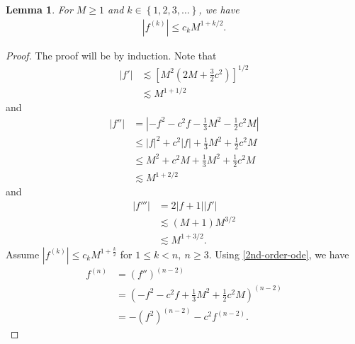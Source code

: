 \documentclass[12pt,reqno]{amsart}
\numberwithin{equation}{section}  %
\newtheorem{lemma}[theorem]{Lemma}
\begin{document}
%
%
%
%
\begin{lemma}
  For $M \ge 1$ and $k \in \left\{ 1,2,3,\dots \right\}$, we have
%
%
\begin{equation}
\begin{split}
  | f^{(k)} | \le c_{k} M^{1 + k/2}.
\end{split}
\label{eqn:deriv-bound}
\end{equation}
%
%
\label{lem:deriv-bound}
\end{lemma}
%
%
%
\begin{proof}
The proof will be by induction. Note that 
%
%
\begin{equation*}
\begin{split}
  | f' |
  & \lesssim \left [ M^{2}(2M + \frac{3}{2}c^{2}) \right]^{1/2}
  \\
  & \lesssim M^{1 + 1/2}
\end{split}
\end{equation*}
%
and
%
%
\begin{equation*}
\begin{split}
| f'' |
& = | -f^{2} - c^{2} f - \frac{1}{3} M^{2} - \frac{1}{2}c^{2} M
 |
\\
& \le | f |^{2} + c^{2} | f | + \frac{1}{3}M^{2} + \frac{1}{2}c^{2} M
\\
& \le M ^{2} +  c^{2} M  + \frac{1}{3}M^{2} + \frac{1}{2}c^{2} M
\\
& \lesssim M^{1 + 2/2}
\end{split}
\end{equation*}
%
and
%
%
\begin{equation*}
\begin{split}
| f''' | 
& = 2 |f+1| | f' |
\\
& \lesssim (M+1)M^{3/2}
\\
& \lesssim M^{1 + 3/2}.
\end{split}
\end{equation*}
%
%
%
%
Assume $| f^{(k)} | \le c_{k} M^{1 + \frac{k}{2}}$ for $1 \le k < n, \ n \ge 3$.
Using \eqref{2nd-order-ode}, we have
%
%
\begin{equation*}
\begin{split}
  f^{(n)}
  & =
  (f'')^{(n-2)}
  \\
  & = \left( -f^{2} - c^{2} f + \frac{1}{3} M^{2} + \frac{1}{2}c^{2} M
 \right)^{(n-2)}
  \\
  & = -(f^{2})^{(n-2)} - c^{2}f^{(n-2)}.
\end{split}
\end{equation*}

\end{proof}
\end{document}
